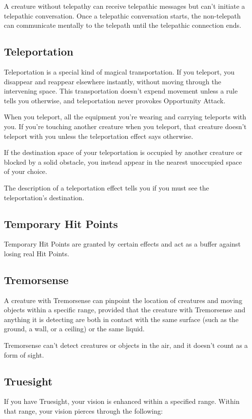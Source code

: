 \documentclass[10pt,a4paper,twoside,bg=print,twocolumn,openany,nodeprecatedcode]{dndarticle}
\begin{document}
A creature without telepathy can receive telepathic messages but can't initiate a telepathic conversation. Once a telepathic conversation starts, the non-telepath can communicate mentally to the telepath until the telepathic connection ends.

\subsection{Teleportation}
Teleportation is a special kind of magical transportation. If you teleport, you disappear and reappear elsewhere instantly, without moving through the intervening space. This transportation doesn't expend movement unless a rule tells you otherwise, and teleportation never provokes Opportunity Attack.

When you teleport, all the equipment you're wearing and carrying teleports with you. If you're touching another creature when you teleport, that creature doesn't teleport with you unless the teleportation effect says otherwise.

If the destination space of your teleportation is occupied by another creature or blocked by a solid obstacle, you instead appear in the nearest unoccupied space of your choice.

The description of a teleportation effect tells you if you must see the teleportation's destination.

\subsection{Temporary Hit Points}
Temporary Hit Points are granted by certain effects and act as a buffer against losing real Hit Points.

\subsection{Tremorsense}
A creature with Tremorsense can pinpoint the location of creatures and moving objects within a specific range, provided that the creature with Tremorsense and anything it is detecting are both in contact with the same surface (such as the ground, a wall, or a ceiling) or the same liquid.

Tremorsense can't detect creatures or objects in the air, and it doesn't count as a form of sight.

\subsection{Truesight}
If you have Truesight, your vision is enhanced within a specified range. Within that range, your vision pierces through the following:
\end{document}
